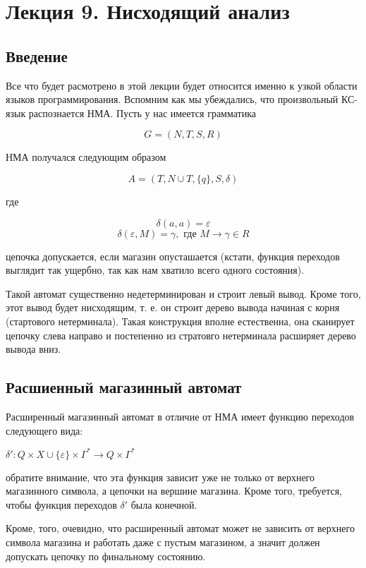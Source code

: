 \chapter{Лекция 9. Нисходящий анализ}

\section{Введение}

Все что будет расмотрено в этой лекции будет относится именно к узкой области языков программирования. Вспомним
как мы убеждались, что произвольный КС-язык распознается НМА. Пусть у нас имеется грамматика

$$ G = \left(N,T,S,R\right) $$

НМА получался следующим образом

$$ A = \left(T, N \cup T, \lbrace q \rbrace, S, \delta \right) $$

где

$$ \delta \left(a, a\right) = \varepsilon $$
$$ \delta \left(\varepsilon, M\right) = \gamma, \text{ где } M \rightarrow \gamma \in R $$

цепочка допускается, если магазин опусташается (кстати, функция переходов выглядит так ущербно, так как нам
хватило всего одного состояния).

Такой автомат существенно недетерминирован и строит левый вывод. Кроме того, этот вывод будет нисходящим, т. е. он строит дерево вывода начиная с корня (стартового нетерминала). Такая конструкция вполне естественна, она сканирует
цепочку слева направо и постепенно из стратовго нетерминала расширяет дерево вывода вниз.

\section{Расшиенный магазинный автомат}

\begin{Def}
Расширенный магазинный автомат в отличие от НМА имеет функцию переходов следующего вида:

$ \delta' : Q \times X \cup \lbrace \varepsilon \rbrace \times \Gamma^{*} \rightarrow Q \times \Gamma^{*} $

обратите внимание, что эта функция зависит уже не только от верхнего магазинного символа, а цепочки на вершине
магазина. Кроме того, требуется, чтобы функция переходов $\delta'$ была конечной.

Кроме, того, очевидно, что расширенный автомат может не зависить от верхнего символа магазина и работать даже
с пустым магазином, а значит должен допускать цепочку по финальному состоянию.
\end{Def}

